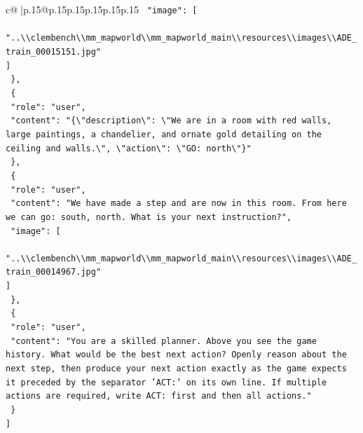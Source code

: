 \documentclass{article}
\begin{document}
{\begin{supertabular}{c@{$\;$}|p{.15\linewidth}@{}p{.15\linewidth}p{.15\linewidth}p{.15\linewidth}p{.15\linewidth}p{.15\linewidth}}
{{{\texttt{    "image": {[}} \\
\texttt{      "..\textbackslash{}\textbackslash{}clembench\textbackslash{}\textbackslash{}mm\_mapworld\textbackslash{}\textbackslash{}mm\_mapworld\_main\textbackslash{}\textbackslash{}resources\textbackslash{}\textbackslash{}images\textbackslash{}\textbackslash{}ADE\_train\_00015151.jpg"} \\
\texttt{    {]}} \\
\texttt{  \},} \\
\texttt{  \{} \\
\texttt{    "role": "user",} \\
\texttt{    "content": "\{\textbackslash{}"description\textbackslash{}": \textbackslash{}"We are in a room with red walls, large paintings, a chandelier, and ornate gold detailing on the ceiling and walls.\textbackslash{}", \textbackslash{}"action\textbackslash{}": \textbackslash{}"GO: north\textbackslash{}"\}"} \\
\texttt{  \},} \\
\texttt{  \{} \\
\texttt{    "role": "user",} \\
\texttt{    "content": "We have made a step and are now in this room. From here we can go: south, north. What is your next instruction?",} \\
\texttt{    "image": {[}} \\
\texttt{      "..\textbackslash{}\textbackslash{}clembench\textbackslash{}\textbackslash{}mm\_mapworld\textbackslash{}\textbackslash{}mm\_mapworld\_main\textbackslash{}\textbackslash{}resources\textbackslash{}\textbackslash{}images\textbackslash{}\textbackslash{}ADE\_train\_00014967.jpg"} \\
\texttt{    {]}} \\
\texttt{  \},} \\
\texttt{  \{} \\
\texttt{    "role": "user",} \\
\texttt{    "content": "You are a skilled planner. Above you see the game history. What would be the best next action? Openly reason about the next step, then produce your next action exactly as the game expects it preceded by the separator 'ACT:' on its own line. If multiple actions are required, write ACT: first and then all actions."} \\
\texttt{  \}} \\
\texttt{{]}} \\
            }
        }
    }
     \\ \\


\end{supertabular}}
\end{document}
